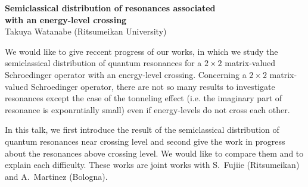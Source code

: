 \documentclass[a4paper,reqno,11pt]{article}
\theoremstyle{plain}
\theoremstyle{definition}
\theoremstyle{remark}
\begin{document}
\begin{center}
\begin{Large}
{\bf Semiclassical distribution of resonances associated 
\\
with an energy-level crossing}
\vspace{12pt}
\\
{\sc Takuya Watanabe} (Ritsumeikan University)
\end{Large}
\end{center}
%
%
\par
%
%
We would like to give reccent progress of our works, in which we study the semiclassical distribution of quantum resonances for a $2\times2$ matrix-valued Schroedinger operator with an energy-level crossing. Concerning a $2\times2$ matrix-valued Schroedinger operator, there are not so many results to investigate resonances except the case of the tonneling effect (i.e. the imaginary part of resonance is exponrntially small) even if energy-levels do not cross each other.  
%
%
\par
%
%
In this talk, we first introduce the result of the semiclassical distribution of quantum resonances near crossing level and second give the work in progress about the resonances above crossing level. We would like to compare them and to explain each difficulty.
These works are joint works with S.~Fujiie (Ritsumeikan) and A.~Martinez (Bologna).  
%
%
%
%
\end{document}
